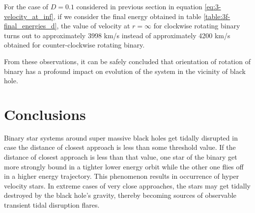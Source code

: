 \documentclass[a4paper]{article}
\begin{document}
\begin{enumerate} [label*=\textbf{(\alph*)}]
				For the case of \(D=0.1\) considered in previous section in equation \ref{eq:3-velocity_at_inf}, if we consider the final energy obtained in table \ref{table:3f-final_energies_d}, the value of velocity at \(r=\infty\) for clockwise rotating binary turns out to approximately 3998 km/s instead of approximately 4200 km/s obtained for counter-clockwise rotating binary.
				
				From these observations, it can be safely concluded that orientation of rotation of binary has a profound impact on evolution of the system in the vicinity of black hole.
				
					
			\end{enumerate}



		\clearpage
		\section{Conclusions} \label{3:conclusions}
		Binary star systems around super massive black holes get tidally disrupted in case the distance of closest approach is less than some threshold value. If the distance of closest approach is less than that value, one star of the binary get more strongly bound in a tighter lower energy orbit while the other one flies off in a higher energy trajectory. This phenomenon results in occurrence of hyper velocity stars. In extreme cases of very close approaches, the stars may get tidally destroyed by the black hole's gravity, thereby becoming sources of observable transient tidal disruption flares.
		
\end{document}
